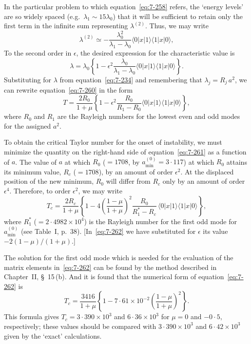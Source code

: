In the particular problem to which equation~\eqref{eq:7-258} refers, the `energy
levels' are so widely spaced (e.g.\ $\lambda_1 \sim 15\lambda_0$) that it will be sufficient to
retain only the first term in the infinite sum representing $\lambda^{(2)}$.  Thus, we
may write
\begin{equation}
\label{eq:7-259}
\lambda^{(2)} \simeq -\frac{\lambda_0^2}{\lambda_1-\lambda_0}
\langle 0|x|1\rangle\langle 1|x|0\rangle,
\end{equation}
To the second order in $\epsilon$, the desired expression for the characteristic
value is
\begin{equation}
\label{eq:7-260}
\lambda = \lambda_0\!\left\{1
- \epsilon^2\frac{\lambda_0}{\lambda_1-\lambda_0}
\langle 0|x|1\rangle\langle 1|x|0\rangle\right\}.
\end{equation}
Substituting for $\lambda$ from equation~\eqref{eq:7-234} and remembering that $\lambda_j = R_j\, a^2$,
we can rewrite equation~\eqref{eq:7-260} in the form
\begin{equation}
\label{eq:7-261}
T = \frac{2R_0}{1+\mu}\!\left\{1
- \epsilon^2\frac{R_0}{R_1-R_0}\langle 0|x|1\rangle\langle 1|x|0\rangle\right\},
\end{equation}
where $R_0$ and $R_1$ are the Rayleigh numbers for the lowest even and odd
modes for the assigned $a^2$.

To obtain the critical Taylor number for the onset of instability, we
must minimize the quantity on the right-hand side of equation~\eqref{eq:7-261}
as a function of $a$.  The value of $a$ at which $R_0$ ($= 1708$, by $a_{\min}^{(0)} = 3{\cdot}117$) at which $R_0$ attains its
minimum value, $R_c$ ($= 1708$), by an amount of order $\epsilon^2$.  At the displaced position of the new minimum, $R_0$ will differ from $R_c$ only by
an amount of order $\epsilon^4$.  Therefore, to order $\epsilon^2$, we may write
\begin{equation}
\label{eq:7-262}
T_c = \frac{2R_c}{1+\mu}\!\left\{1
- 4\!\left(\frac{1-\mu}{1+\mu}\right)^{\!2}
\frac{R_0}{R_1^*-R_c}\,
\langle 0|x|1\rangle\langle 1|x|0\rangle\right\},
\end{equation}
where $R_1^*$ ($= 2{\cdot}4982\times 10^4$) is the Rayleigh number for the first odd
mode for $a_{\min}^{(0)}$ (see Table~I, p.~38).  [In~\eqref{eq:7-262} we have substituted for $\epsilon$ its value
$-2(1-\mu)/(1+\mu)$.]

The solution for the first odd mode which is needed for the evaluation
of the matrix elements in~\eqref{eq:7-262} can be found by the method described in
Chapter~II, \S~15\,(b).  And it is found that the numerical form of equation~\eqref{eq:7-262} is
\begin{equation}
\label{eq:7-263}
T_c = \frac{3416}{1+\mu}
\!\left\{1-7{\cdot}61\times 10^{-2}
\!\left(\frac{1-\mu}{1+\mu}\right)^{\!2}\right\}.
\end{equation}
This formula gives $T_c = 3{\cdot}390\times 10^3$ and $6{\cdot}36\times 10^3$ for $\mu = 0$ and $-0{\cdot}5$,
respectively; these values should be compared with $3{\cdot}390\times 10^3$ and
$6{\cdot}42\times 10^3$ given by the `exact' calculations.

